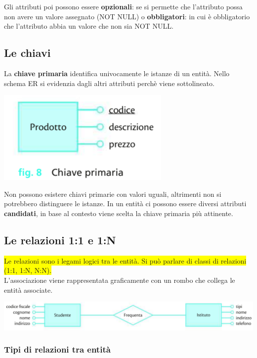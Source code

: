 \documentclass{article}
\begin{document}
Gli attributi poi possono essere \textbf{opzionali}: se si permette che l'attributo possa non avere un valore assegnato (NOT NULL) o \textbf{obbligatori}: in cui è obbligatorio che l'attributo abbia un valore che non sia NOT NULL.
\subsection{Le chiavi}
La \textbf{chiave primaria} identifica univocamente le istanze di un entità. Nello schema ER si evidenzia dagli altri attributi perchè viene sottolineato.
\begin{center}
\includegraphics[]{chiave.PNG}    
\end{center}
Non possono esistere chiavi primarie con valori uguali, altrimenti non si potrebbero distinguere le istanze. In un entità ci possono essere diversi attributi \textbf{candidati}, in base al contesto viene scelta la chiave primaria più attinente.
\subsection{Le relazioni 1:1 e 1:N}
\colorbox{yellow}{Le relazioni sono i legami logici tra le entità. Si può parlare di classi di relazioni (1:1, 1:N, N:N).}\\
L'associazione viene rappresentata graficamente con un rombo che collega le entità associate.\\
\begin{center}
\includegraphics[scale=0.9]{ent.PNG}    
\end{center}

\subsubsection{Tipi di relazioni tra entità}
\end{document}
